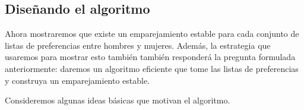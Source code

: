 \documentclass[a4paper, 12pt]{book}
\begin{document}
\subsection*{Diseñando el algoritmo}

Ahora mostraremos que existe un emparejamiento estable para cada conjunto de listas de preferencias entre hombres y mujeres. Además, la estrategia que usaremos para mostrar esto también también responderá la pregunta formulada anteriormente: daremos un algoritmo eficiente que tome las listas de preferencias y construya un emparejamiento estable.  

Consideremos algunas ideas básicas que motivan el algoritmo. 

\end{document}
